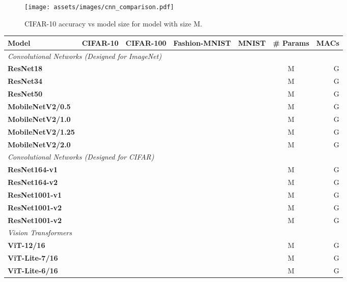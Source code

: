 \documentclass[10pt,twocolumn,letterpaper]{article}
\begin{document}
\begin{figure}[ht]
\centering
\texttt{[image: assets/images/cnn\_comparison.pdf]}
\caption{CIFAR-10 accuracy vs model size for model with size M.}
\label{fig:mobilenet_comparison}
\end{figure}

\begin{table*}[ht]
    \centering
    \begin{tabular}{l|cccc|cr}
        \toprule
        \textbf{Model} & \textbf{CIFAR-10} & \textbf{CIFAR-100} & \textbf{Fashion-MNIST} & \textbf{MNIST} & \textbf{\# Params} & \textbf{MACs}\\
        \midrule
        \multicolumn{3}{l}{\textit{Convolutional Networks (Designed for ImageNet)}}\\
        \midrule
        \textbf{ResNet18} &  &  &  &  &  M &  G \\
        \textbf{ResNet34} &  &  &  &  &  M &  G \\
        \textbf{ResNet50} &  &  &  &  &  M &  G \\
        \midrule
        \textbf{MobileNetV2/0.5} &  &  &  &  &  M &  G \\
        \textbf{MobileNetV2/1.0} &  &  &  &  &  M &  G \\
        \textbf{MobileNetV2/1.25} &  &  &  &  &  M &  G \\
        \textbf{MobileNetV2/2.0} &  &  &  &  &  M &  G \\
        \midrule
        \multicolumn{3}{l}{\textit{Convolutional Networks (Designed for CIFAR)}}\\
        \midrule
\textbf{ResNet164-v1\cite{he2016identity}} &  &  &  &  &  M &  G \\
        \textbf{ResNet164-v2\cite{he2016identity}} &  &  &  &  &  M &  G \\
        \textbf{ResNet1001-v1\cite{he2016identity}} &  &  &  &  &  M &  G \\
        \textbf{ResNet1001-v2\cite{he2016identity}} &  &  &  &  &  M &  G \\
        \textbf{ResNet1001-v2\cite{he2016identity}} &  &  &  &  &  M &  G \\
        \midrule
        \multicolumn{3}{l}{\textit{Vision Transformers}}\\
        \midrule
        \textbf{ViT-12/16} &  &  &  &  &  M &  G \\
        \midrule
        \textbf{ViT-Lite-7/16} &  &  &  &  &  M &  G \\
        \textbf{ViT-Lite-6/16} &  &  &  &  &  M &  G \\

\end{tabular}
\end{table*}
\end{document}
